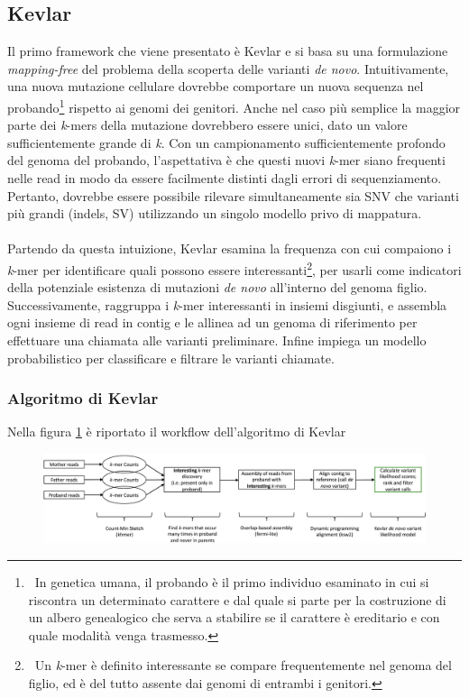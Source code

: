 \documentclass[../main.tex]{subfiles}
\begin{document}
\subsection{Kevlar}
\label{kevlar}

Il primo framework che viene presentato è Kevlar \cite{standage2019kevlar} e si basa su una formulazione \textit{mapping-free} del problema della scoperta delle varianti \textit{de novo}. Intuitivamente, una nuova mutazione cellulare dovrebbe comportare un nuova sequenza nel probando\footnote{\ In genetica umana, il probando è il primo individuo esaminato in cui si riscontra un determinato carattere e dal quale si parte per la costruzione di un albero genealogico che serva a stabilire se il carattere è ereditario e con quale modalità venga trasmesso.} rispetto ai genomi dei genitori. Anche nel caso più semplice la maggior parte dei \textit{k}-mers della mutazione dovrebbero essere unici, dato un valore sufficientemente grande di \textit{k}. Con un campionamento sufficientemente profondo del genoma del probando, l'aspettativa è che questi nuovi \textit{k}-mer siano frequenti nelle read in modo da essere facilmente distinti dagli errori di sequenziamento. Pertanto, dovrebbe essere possibile rilevare simultaneamente sia SNV che varianti più grandi (indels, SV) utilizzando un singolo modello privo di mappatura.
\\\\
Partendo da questa intuizione, Kevlar esamina la frequenza con cui compaiono i \textit{k}-mer per identificare quali possono essere interessanti\footnote{\ Un \textit{k}-mer è definito interessante se compare frequentemente nel genoma del figlio, ed è del tutto assente dai genomi di entrambi i genitori.}, per usarli come indicatori della potenziale esistenza di mutazioni \textit{de novo} all'interno del genoma figlio. Successivamente, raggruppa i \textit{k}-mer interessanti in insiemi disgiunti, e assembla ogni insieme di read in contig e le allinea ad un genoma di riferimento per effettuare una chiamata alle varianti preliminare. Infine impiega un modello probabilistico per classificare e filtrare le varianti chiamate.

\subsubsection{Algoritmo di Kevlar}

Nella figura \ref{fig:kevlar_pipeline} è riportato il workflow dell'algoritmo di Kevlar

\begin{figure}[ht!]
	\centering
  	\captionsetup{justification=centering}
  	\includegraphics[scale=.27]{images/kevlar_pipeline.png}
  	\caption{}
  	\label{fig:kevlar_pipeline}
\end{figure}
\end{document}

